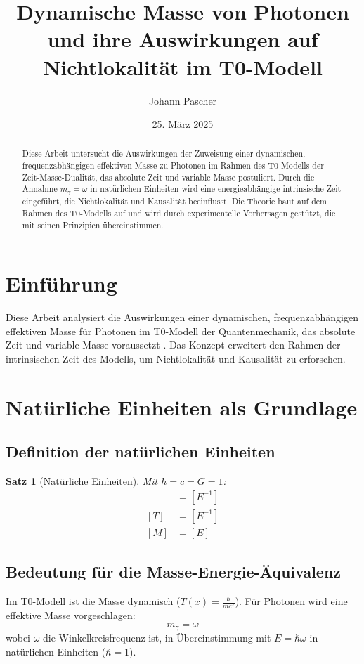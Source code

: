 \documentclass[12pt,a4paper]{article}
\title{Dynamische Masse von Photonen und ihre Auswirkungen auf Nichtlokalität im T0-Modell}
\author{Johann Pascher}
\date{25. März 2025}
\newcommand{\Tfield}{T(x)}
\newtheorem{theorem}{Satz}[section]
\begin{document}
	
	\maketitle
	
	\begin{abstract}
		Diese Arbeit untersucht die Auswirkungen der Zuweisung einer dynamischen, frequenzabhängigen effektiven Masse zu Photonen im Rahmen des T0-Modells der Zeit-Masse-Dualität, das absolute Zeit und variable Masse postuliert. Durch die Annahme \(m_\gamma = \omega\) in natürlichen Einheiten wird eine energieabhängige intrinsische Zeit eingeführt, die Nichtlokalität und Kausalität beeinflusst. Die Theorie baut auf dem Rahmen des T0-Modells auf und wird durch experimentelle Vorhersagen gestützt, die mit seinen Prinzipien übereinstimmen.
	\end{abstract}
	
	\tableofcontents
	\newpage
	
	\section{Einführung}
	Diese Arbeit analysiert die Auswirkungen einer dynamischen, frequenzabhängigen effektiven Masse für Photonen im T0-Modell der Quantenmechanik, das absolute Zeit und variable Masse voraussetzt \cite{pascher_galaxies_2025}. Das Konzept erweitert den Rahmen der intrinsischen Zeit des Modells, um Nichtlokalität und Kausalität zu erforschen.
	
	\section{Natürliche Einheiten als Grundlage}
	\subsection{Definition der natürlichen Einheiten}
	\begin{theorem}[Natürliche Einheiten]
		Mit \(\hbar = c = G = 1\):
		\begin{align}
			[L] &= [E^{-1}] \\
			[T] &= [E^{-1}] \\
			[M] &= [E]
		\end{align}
	\end{theorem}
	
	\subsection{Bedeutung für die Masse-Energie-Äquivalenz}
	Im T0-Modell ist die Masse dynamisch (\(\Tfield = \frac{\hbar}{mc^2}\)). Für Photonen wird eine effektive Masse vorgeschlagen:
	\begin{equation}
		m_\gamma = \omega
	\end{equation}
	wobei \(\omega\) die Winkelkreisfrequenz ist, in Übereinstimmung mit \(E = \hbar \omega\) in natürlichen Einheiten (\(\hbar = 1\)).
	
\end{document}
